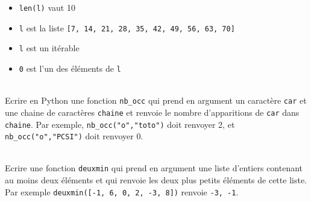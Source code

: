 \documentclass[11pt,a4paper]{article}
\begin{document}
\begin{Exercise}[title={QCM}]
\begin{tabularx}{\linewidth}{@{}XXXX@{}}
	\end{tabularx}
    \begin{itemize}
    \item[\gc] {\tt len(l)} vaut 10 
    \item[\bc] {\tt l} est la liste {\tt [7, 14, 21, 28, 35, 42, 49, 56, 63, 70]} 
    \item[\gc] {\tt l} est un itérable
    \item[\gc] {\tt 0} est l'un des éléments de {\tt l} 
    \end{itemize}
\end{Exercise}

\begin{Exercise}[title = {Définir une fonction}]\\
    Ecrire en Python une fonction {\tt nb\_occ} qui prend en argument un caractère {\tt car} et une chaine de caractères {\tt chaine} et renvoie le nombre d'apparitions de  {\tt car} dans {\tt chaine}. Par exemple, {\tt nb\_occ("o","toto")} doit renvoyer 2, et {\tt nb\_occ("o","PCSI")} doit renvoyer 0.
	\ifcorrige
	\fi
\end{Exercise}


\begin{Exercise}[title = {Exercice bonus}]\\
	Ecrire une fonction {\tt deuxmin} qui prend en argument une liste d'entiers contenant au moins deux éléments et qui renvoie les deux plus petits éléments de cette liste. Par exemple {\tt deuxmin([-1, 6, 0, 2, -3, 8])} renvoie {\tt -3, -1}.
\end{Exercise}
	\ifcorrige
	\fi
\end{document}
